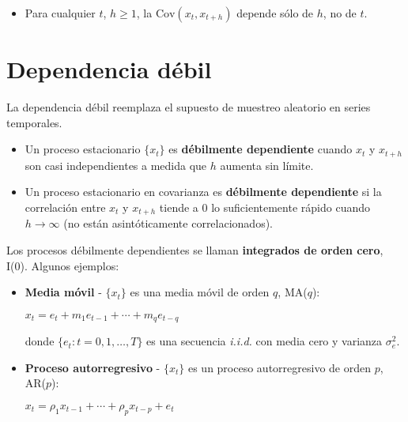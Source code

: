 \documentclass[10pt, a4paper, landscape]{article}
\newcommand{\Var}{\mathrm{Var}}
\newcommand{\Cov}{\mathrm{Cov}}
\begin{document}
\begin{multicols}{3}
\begin{itemize}[leftmargin=*]
\begin{itemize}[leftmargin=*]
				
				\item Para cualquier $t$, $h \geq 1$, la $\Cov(x_{t}, x_{t + h})$ depende sólo de $h$, no de $t$.
			\end{itemize}
		\end{itemize}
		
		\section*{Dependencia débil}
		
		La dependencia débil reemplaza el supuesto de muestreo aleatorio en series temporales.
		
		\begin{itemize}[leftmargin=*]
			\item Un proceso estacionario $\lbrace x_{t} \rbrace$ es \textbf{débilmente dependiente} cuando $x_{t}$ y $x_{t + h}$ son casi independientes a medida que $h$ aumenta sin límite.
			\item Un proceso estacionario en covarianza es \textbf{débilmente dependiente} si la correlación entre $x_{t}$ y $x_{t + h}$ tiende a $0$ lo suficientemente rápido cuando $h \rightarrow \infty$ (no están asintóticamente correlacionados).
		\end{itemize}
		
		Los procesos débilmente dependientes se llaman \textbf{integrados de orden cero}, I(0). Algunos ejemplos:
		
		\begin{itemize}[leftmargin=*]
			\item \textbf{Media móvil} - $\lbrace x_{t} \rbrace$ es una media móvil de orden $q$, MA($q$):
			
			\begin{center}
				$x_{t} = e_{t} + m_{1} e_{t - 1} + \cdots + m_{q} e_{t - q}$
			\end{center}
			
			donde $\lbrace e_{t} : t = 0, 1, \ldots, T \rbrace$ es una secuencia \textsl{i.i.d.} con media cero y varianza $\sigma^{2}_{e}$.
			
			\item \textbf{Proceso autorregresivo} - $\lbrace x_{t} \rbrace$ es un proceso autorregresivo de orden $p$, AR($p$):
			
			\begin{center}
				$x_{t} = \rho_{1} x_{t - 1} + \cdots + \rho_{p} x_{t - p} + e_{t}$
			\end{center}
			

\end{itemize}
\end{multicols}
\end{document}
